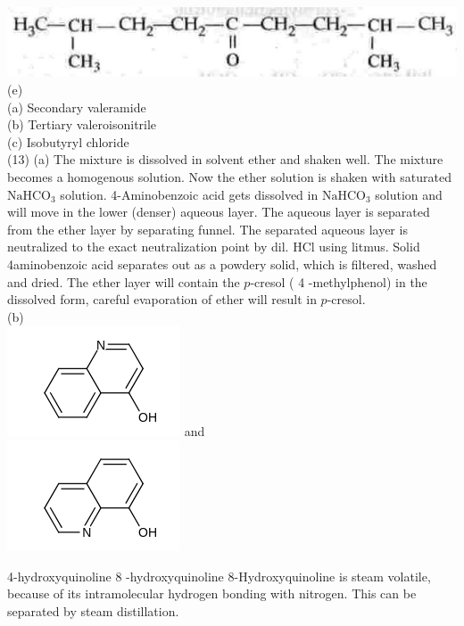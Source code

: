 \documentclass[10pt]{article}
\begin{document}
\includegraphics[max width=\textwidth, center]{2025_01_28_8470952b98110cec3aabg-168(1)}\\
(e)\\
(a) Secondary valeramide\\
(b) Tertiary valeroisonitrile\\
(c) Isobutyryl chloride\\
(13) (a) The mixture is dissolved in solvent ether and shaken well. The mixture becomes a homogenous solution. Now the ether solution is shaken with saturated $\mathrm{NaHCO}_{3}$ solution. 4-Aminobenzoic acid gets dissolved in $\mathrm{NaHCO}_{3}$ solution and will move in the lower (denser) aqueous layer. The aqueous layer is separated from the ether layer by separating funnel. The separated aqueous layer is neutralized to the exact neutralization point by dil. HCl using litmus. Solid 4aminobenzoic acid separates out as a powdery solid, which is filtered, washed and dried. The ether layer will contain the $p$-cresol ( 4 -methylphenol) in the dissolved form, careful evaporation of ether will result in $p$-cresol.\\
(b)\\
\includegraphics{smile-f500bcff3add3500b18328c53a7a1148b135cae2} and\\
\includegraphics{smile-f7faf2f2dcce25c7a1e4c8b510d304d3fa95bf73}

4-hydroxyquinoline 8 -hydroxyquinoline 8-Hydroxyquinoline is steam volatile, because of its intramolecular hydrogen bonding with nitrogen. This can be separated by steam distillation.
\end{document}
